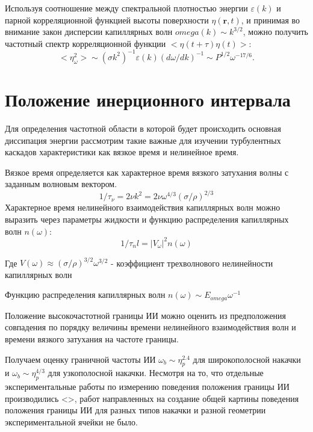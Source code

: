Используя соотношение между спектральной плотностью энергии $\varepsilon(k)$ и парной корреляционной функцией высоты поверхности $\eta(\mathbf{r}, t)$, и принимая во внимание закон дисперсии капиллярных волн $omega(k) \sim k^{3/2}$, можно получить частотный спектр корреляционной функции $<\eta(t+\tau)\eta(t)>$:
\begin{equation}
<\eta_\omega^2> \sim (\sigma k^2)^{-1} \varepsilon(k)(d\omega/dk)^{-1} \sim P^{1/2} \omega^{-17/6}.
\end{equation}



\section{Положение инерционного интервала}%

Для определения частотной области в которой будет происходить основная диссипация энергии рассмотрим такие важные для изучении турбулентных каскадов характеристики как вязкое время и нелинейное время.

Вязкое время определяется как характерное время вязкого затухания волны с заданным волновым вектором.
\begin{equation}
1/\tau_\nu = 2\nu k^2 = 2 \nu \omega^{4/3}(\sigma/\rho)^{2/3}
\end{equation}
Характерное время нелинейного взаимодействия капиллярных волн можно выразить через параметры жидкости и функцию распределения капиллярных волн $n(\omega)$:
\begin{equation}
1/\tau_nl = |V_\omega|^2 n(\omega)
\end{equation}

Где $V(\omega) \approx (\sigma/\rho)^{3/2}\omega^{3/2}$ - коэффициент трехволнового нелинейности капиллярных волн

Функцию распределения капиллярных волн $n(\omega) \sim E_{omega}\omega^{-1}$ 

Положение высокочастотной границы ИИ можно оценить из предположения совпадения по порядку величины времени нелинейного взаимодействия волн и времени вязкого затухания на частоте границы.

Получаем оценку граничной частоты ИИ $\omega_b \sim \eta_p^{2.4}$ для широкополосной накачки и $\omega_b \sim \eta_p^{4/3}$ для узкополосной накачки. Несмотря на то, что отдельные экспериментальные работы по измерению поведения положения границы ИИ производились <>, работ направленных на создание общей картины поведения положения границы ИИ для разных типов накачки и разной геометрии экспериментальной ячейки не было.


